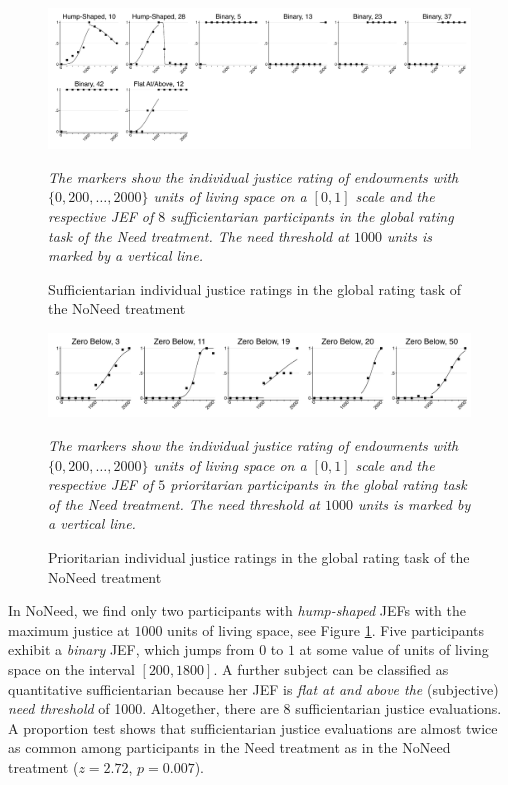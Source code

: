 \documentclass[12pt]{scrartcl}
\begin{document}
\begin{figure}[h!t!]
   \centering
   \includegraphics[width=\linewidth]{figures/figure_6.pdf}
   \begin{minipage}{\linewidth}
      \footnotesize
      \textit{The markers show the individual justice rating of endowments with $\{0,200,\ldots,2000\}$ units of living space on a $[0,1]$ scale and the respective JEF of $8$ sufficientarian participants in the global rating task of the Need treatment. The need threshold at $1000$ units is marked by a vertical line.}
   \end{minipage}
   \caption{Sufficientarian individual justice ratings in the global rating task of the NoNeed treatment}\label{fig:figure_6}
\end{figure}

\begin{figure}[h!t!]
   \centering
   \includegraphics[width=11.7cm]{figures/figure_7.pdf}
   \begin{minipage}{\linewidth}
      \footnotesize
      \textit{The markers show the individual justice rating of endowments with $\{0,200,\ldots,2000\}$ units of living space on a $[0,1]$ scale and the respective JEF of $5$ prioritarian participants in the global rating task of the Need treatment. The need threshold at $1000$ units is marked by a vertical line.}
   \end{minipage}
   \caption{Prioritarian individual justice ratings in the global rating task of the NoNeed treatment}\label{fig:figure_7}
\end{figure}

In NoNeed, we find only two participants with \textit{hump-shaped} JEFs with the maximum justice at $1000$ units of living space, see Figure \ref{fig:figure_6}.
Five participants exhibit a \textit{binary} JEF, which jumps from $0$ to $1$ at some value of units of living space on the interval $[200,1800]$.
A further subject can be classified as quantitative sufficientarian because her JEF is \textit{flat at and above the} (subjective) \textit{need threshold} of 1000.
Altogether, there are $8$ sufficientarian justice evaluations.
A proportion test shows that sufficientarian justice evaluations are almost twice as common among participants in the Need treatment as in the NoNeed treatment ($z=2.72$, $p=0.007$).
\end{document}
